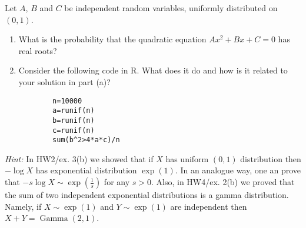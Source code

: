 
\begin{exercise}

Let $A$, $B$ and $C$ be independent random variables, uniformly distributed on $(0, 1)$.

\begin{enumerate}[label = (\alph*)]

    \item What is the probability that the quadratic equation $A x^2 + B x + C = 0$ has real roots?

    \item Consider the following code in R.
    What does it do and how is it related to your solution in part (a)?

    \begin{lstlisting}
        n=10000
        a=runif(n)
        b=runif(n)
        c=runif(n)
        sum(b^2>4*a*c)/n
    \end{lstlisting}

\end{enumerate}

\textit{Hint:}
In HW2/ex. 3(b) we showed that if $X$ has uniform $(0, 1)$ distribution then $-\log X$ has exponential distribution $\exp(1)$.
In an analogue way, one an prove that $-s \log X \sim \exp(\frac{1}{s})$ for any $s > 0$.
Also, in HW4/ex. 2(b) we proved that the sum of two independent exponential distributions is a gamma distribution.
Namely, if $X \sim \exp(1)$ and $Y \sim \exp(1)$ are independent then $X + Y = \operatorname{Gamma}(2, 1)$.

\end{exercise}


